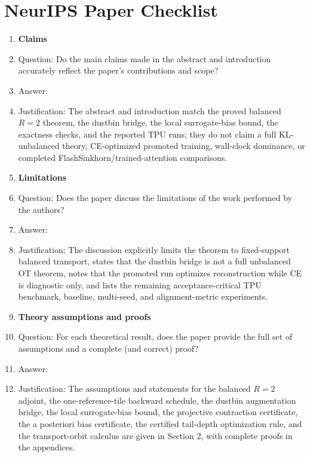 \section*{NeurIPS Paper Checklist}

\begin{enumerate}

\item {\bf Claims}
    \item[] Question: Do the main claims made in the abstract and introduction accurately reflect the paper's contributions and scope?
    \item[] Answer: \answerYes{}
    \item[] Justification: The abstract and introduction match the proved balanced $R=2$ theorem, the dustbin bridge, the local surrogate-bias bound, the exactness checks, and the reported TPU runs; they do not claim a full KL-unbalanced theory, CE-optimized promoted training, wall-clock dominance, or completed FlashSinkhorn/trained-attention comparisons.

\item {\bf Limitations}
    \item[] Question: Does the paper discuss the limitations of the work performed by the authors?
    \item[] Answer: \answerYes{}
    \item[] Justification: The discussion explicitly limits the theorem to fixed-support balanced transport, states that the dustbin bridge is not a full unbalanced OT theorem, notes that the promoted run optimizes reconstruction while CE is diagnostic only, and lists the remaining acceptance-critical TPU benchmark, baseline, multi-seed, and alignment-metric experiments.

\item {\bf Theory assumptions and proofs}
    \item[] Question: For each theoretical result, does the paper provide the full set of assumptions and a complete (and correct) proof?
    \item[] Answer: \answerYes{}
    \item[] Justification: The assumptions and statements for the balanced $R=2$ adjoint, the one-reference-tile backward schedule, the dustbin augmentation bridge, the local surrogate-bias bound, the projective contraction certificate, the a posteriori bias certificate, the certified tail-depth optimization rule, and the transport-orbit calculus are given in Section 2, with complete proofs in the appendices.


\end{enumerate}
